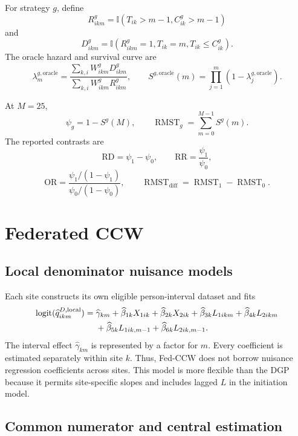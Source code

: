 \documentclass[11pt]{article}
\newcommand{\ind}{\mathbb{I}}
\newcommand{\RMST}{\operatorname{RMST}}
\begin{document}
For strategy $g$, define
\[
  R^g_{ikm}=\ind(T_{ik}>m-1,C^g_{ik}>m-1)
\]
and
\[
  D^g_{ikm}=\ind(R^g_{ikm}=1,T_{ik}=m,T_{ik}\leq C^g_{ik}).
\]
The oracle hazard and survival curve are
\[
  \lambda_m^{g,\mathrm{oracle}}
  =\frac{\sum_{k,i}W^g_{ikm}D^g_{ikm}}
         {\sum_{k,i}W^g_{ikm}R^g_{ikm}},
  \qquad
  S^{g,\mathrm{oracle}}(m)
  =\prod_{j=1}^m(1-\lambda_j^{g,\mathrm{oracle}}).
\]

At $M=25$,
\[
  \psi_g=1-S^g(M),
  \qquad
  \RMST_g=\sum_{m=0}^{M-1}S^g(m).
\]
The reported contrasts are
\[
  \mathrm{RD}=\psi_1-\psi_0,
  \qquad
  \mathrm{RR}=\frac{\psi_1}{\psi_0},
\]
\[
  \mathrm{OR}
  =\frac{\psi_1/(1-\psi_1)}{\psi_0/(1-\psi_0)},
  \qquad
  \RMST_{\mathrm{diff}}=\RMST_1-\RMST_0.
\]

\section{Federated CCW}

\subsection{Local denominator nuisance models}

Each site constructs its own eligible person-interval dataset and fits
\begin{align}
\label{eq:local-den}
  \operatorname{logit}(\widehat q^{D,\mathrm{local}}_{ikm})
  ={}&\widehat\gamma_{km}
      +\widehat\beta_{1k}X_{1ik}
      +\widehat\beta_{2k}X_{2ik}
      +\widehat\beta_{3k}L_{1ikm}
      +\widehat\beta_{4k}L_{2ikm} \notag\\
     &+\widehat\beta_{5k}L_{1ik,m-1}
      +\widehat\beta_{6k}L_{2ik,m-1}.
\end{align}
The interval effect $\widehat\gamma_{km}$ is represented by a factor for
$m$. Every coefficient is estimated separately within site $k$. Thus,
Fed-CCW does not borrow nuisance regression coefficients across sites. This
model is more flexible than the DGP because it permits site-specific slopes
and includes lagged $L$ in the initiation model.

\subsection{Common numerator and central estimation}
\end{document}
